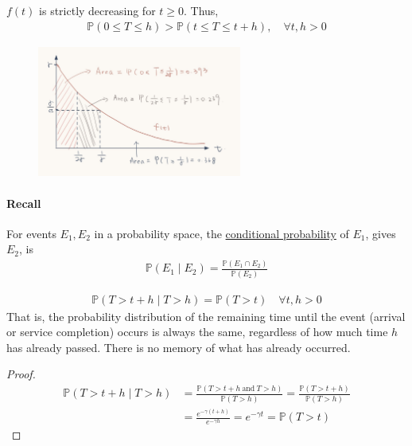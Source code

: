 \setcounter{proposition}{1}
\begin{proposition}
    $f(t)$ is strictly decreasing for $t\geqslant 0$. Thus, 
    \begin{align*}
        \mathbb{P}(0\leqslant T\leqslant h) > \mathbb{P}(t\leqslant T\leqslant t+h),\quad \forall t,h >0
    \end{align*}
    \begin{figure}[H]
        \centering
        \includegraphics[width = 0.6\textwidth]{document/4-2.jpg}
    \end{figure}
\end{proposition}

\paragraph{Recall} For events $E_1,E_2$ in a probability space, the \uline{conditional probability} of $E_1$, gives $E_2$, is
\begin{align*}
    \mathbb{P}(E_1\mid E_2) = \frac{\mathbb{P}(E_1\cap E_2)}{\mathbb{P}(E_2)}
\end{align*}

\begin{proposition}
    \begin{align*}
        \mathbb{P}(T>t+h\mid T>h) = \mathbb{P}(T>t) \quad \forall t,h>0
    \end{align*}
    That is, the probability distribution of the remaining time until the event (arrival or service completion) occurs is always the same, regardless of how much time $h$ has already passed. There is no memory of what has already occurred.
\end{proposition}
\begin{proof}
    \begin{align*}
        \mathbb{P}(T>t+h\mid T>h) &= \frac{\mathbb{P}(T>t+h\ \text{and}\ T>h)}{\mathbb{P}(T>h)} = \frac{\mathbb{P}(T>t+h)}{\mathbb{P}(T>h)} \\
        &= \frac{e^{-\gamma (t+h)}}{e^{-\gamma h}} = e^{-\gamma t} = \mathbb{P}(T>t)
    \end{align*}
\end{proof}

